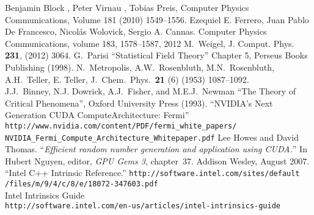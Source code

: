 \documentclass[a4paper]{llncs}
\begin{document}
\begin{thebibliography}{9}
Benjamin Block , Peter Virnau , Tobias Preis, Computer Physics Communications, Volume 181 (2010) 1549–1556.
Ezequiel E. Ferrero, Juan Pablo De Francesco, Nicolás Wolovick, Sergio A. Cannas. Computer Physics Communications, volume 183, 1578--1587, 2012
 M.~Weigel, J. Comput. Phys. \textbf{231},  (2012) 3064.
 G.~Parisi ``Statistical Field Theory'' Chapter 5, Perseus Books Publishing (1998).
N.~Metropolis, A.W.~Rosenbluth, M.N.~Rosenbluth, A.H.~Teller, E. Teller,
   J.~Chem.~Phys.~\textbf{21} (6) (1953) 1087--1092.\\
J.J.~Binney, N.J. Dowrick, A.J.~Fisher, and M.E.J.~Newman ``The Theory of Critical Phenomena'', Oxford University Press (1993).
``NVIDIA's Next Generation CUDA ComputeArchitecture: Fermi'' \\
\verb!http://www.nvidia.com/content/PDF/fermi_white_papers/!\\
\verb!NVIDIA_Fermi_Compute_Architecture_Whitepaper.pdf!
Lee Howes and David Thomas.
``{\em Efficient random number generation and application using {CUDA}.}''
In Hubert Nguyen, editor, {\em GPU Gems 3}, chapter~37. Addison
  Wesley, August 2007.
 ``Intel C++ Intrinsic Reference.'' \verb!http://software.intel.com/sites/default!\\\verb!/files/m/9/4/c/8/e/18072-347603.pdf! \\
Intel Intrinsics Guide\\ \verb!http://software.intel.com/en-us/articles/intel-intrinsics-guide!

\end{thebibliography}
\end{document}
